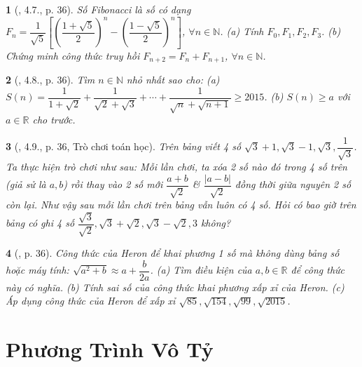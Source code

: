 \documentclass{article}
\newtheorem{baitoan}{}%
\begin{document}
\begin{baitoan}[\cite{Binh_boi_duong_Toan_9_tap_1}, 4.7., p. 36]
	Số Fibonacci là số có dạng $F_n = \dfrac{1}{\sqrt{5}}\left[\left(\dfrac{1 + \sqrt{5}}{2}\right)^n - \left(\dfrac{1 - \sqrt{5}}{2}\right)^n\right]$, $\forall n\in\mathbb{N}$. (a) Tính $F_0,F_1,F_2,F_3$. (b) Chứng minh công thức truy hồi $F_{n + 2} = F_n + F_{n + 1}$, $\forall n\in\mathbb{N}$.
\end{baitoan}

\begin{baitoan}[\cite{Binh_boi_duong_Toan_9_tap_1}, 4.8., p. 36]
	Tìm $n\in\mathbb{N}$ nhỏ nhất sao cho: (a) $S(n) = \dfrac{1}{1 + \sqrt{2}} + \dfrac{1}{\sqrt{2} + \sqrt{3}} + \cdots + \dfrac{1}{\sqrt{n} + \sqrt{n + 1}}\ge2015$. (b) $S(n)\ge a$ với $a\in\mathbb{R}$ cho trước.
\end{baitoan}

\begin{baitoan}[\cite{Binh_boi_duong_Toan_9_tap_1}, 4.9., p. 36, Trò chơi toán học]
	Trên bảng viết 4 số $\sqrt{3} + 1,\sqrt{3} - 1,\sqrt{3},\dfrac{1}{\sqrt{3}}$. Ta thực hiện trò chơi như sau: Mỗi lần chơi, ta xóa 2 số nào đó trong 4 số trên (giả sử là $a,b$) rồi thay vào 2 số mới $\dfrac{a + b}{\sqrt{2}}$ \& $\dfrac{|a - b|}{\sqrt{2}}$ đồng thời giữa nguyên 2 số còn lại. Như vậy sau mỗi lần chơi trên bảng vẫn luôn có 4 số. Hỏi có bao giờ trên bảng có ghi 4 số $\dfrac{\sqrt{3}}{\sqrt{2}},\sqrt{3} + \sqrt{2},\sqrt{3} - \sqrt{2},3$ không?
\end{baitoan}

\begin{baitoan}[\cite{Binh_boi_duong_Toan_9_tap_1}, p. 36]
	Công thức của Heron để khai phương 1 số mà không dùng bảng số hoặc máy tính: $\sqrt{a^2 + b}\approx a + \dfrac{b}{2a}$. (a) Tìm điều kiện của $a,b\in\mathbb{R}$ để công thức này có nghĩa. (b) Tính sai số của công thức khai phương xấp xỉ của Heron. (c) Áp dụng công thức của Heron để xấp xỉ $\sqrt{85},\sqrt{154},\sqrt{99},\sqrt{2015}$.
\end{baitoan}


\section{Phương Trình Vô Tỷ}
\end{document}
